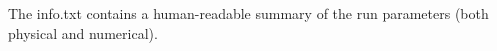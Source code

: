 The info.txt contains a human-\/readable summary of the run parameters (both physical and numerical). 